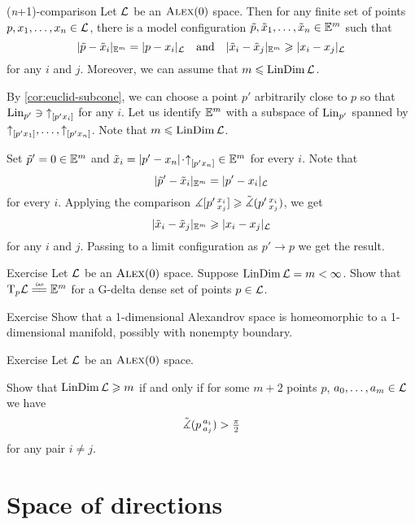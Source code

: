 \begin{thm}{(\textit{n}+1)-comparison}
Let $\mathcal{L}$ be an $\textsc{Alex}(0)$ space.
Then for any finite set of points $p,x_1,\dots,x_n\in \mathcal{L}$, there is a model configuration 
$\tilde p,\tilde x_1,\dots,\tilde x_n\in \mathbb{E}^m$ such that 
\[|\tilde p-\tilde x_i|_{\mathbb{E}^m}=| p- x_i|_{\mathcal{L}}
\quad\text{and}\quad
|\tilde x_i-\tilde x_j|_{\mathbb{E}^m}\geqslant |x_i- x_j|_{\mathcal{L}}\]
for any $i$ and $j$.
Moreover, we can assume that $m\leqslant \mathop{\rm LinDim}\nolimits\mathcal{L}$. 
\end{thm}

By \ref{cor:euclid-subcone}, we can choose a point $p'$ arbitrarily close to $p$ so that 
$\mathop{\rm Lin}\nolimits_{p'}\ni {\uparrow}_{[{p'}{x_i}]}$ for any $i$.
Let us identify $\mathbb{E}^m$ with a subspace of $\mathop{\rm Lin}\nolimits_{p'}$ spanned by ${\uparrow}_{[{p'}{x_1}]},\dots,{\uparrow}_{[{p'}{x_n}]}$.
Note that $m\leqslant \mathop{\rm LinDim}\nolimits\mathcal{L}$.

Set $\tilde p'=0\in \mathbb{E}^m$ and $\tilde x_i=\dist{p'}{x_n}{}\cdot\dir{p'}{x_n}\in \EE^m$ for every $i$.
Note that 
\[|\tilde p'-\tilde x_i|_{\mathbb{E}^m}=| p'- x_i|_{\mathcal{L}}\]
for every $i$.
Applying the comparison $\measuredangle[p'\,{}^{x_i}_{x_j}]\geqslant \tilde\measuredangle(p'\,{}^{x_i}_{x_j})$, we get
\[|\tilde x_i-\tilde x_j|_{\mathbb{E}^m}\geqslant |x_i- x_j|_{\mathcal{L}}\]
for any $i$ and $j$.
Passing to a limit configuration as $p'\to p$ we get the result.
\qeds

\begin{thm}{Exercise}\label{ex:tangent=Em}
Let $\mathcal{L}$ be an $\textsc{Alex}(0)$ space.
Suppose $\LinDim\spc{L}\z=m<\infty$.
Show that $\T_p\spc{L}\iso \EE^m$ for a G-delta dense set of points $p\in\mathcal{L}$.
\end{thm}

\begin{thm}{Exercise}\label{ex:dim=1}
Show that a 1-dimensional Alexandrov space is homeomorphic to a 1-dimensional manifold, possibly with nonempty boundary.
\end{thm}


\begin{thm}{Exercise}\label{ex:resporka}
Let $\mathcal{L}$ be an $\textsc{Alex}(0)$ space.

Show that $\mathop{\rm LinDim}\nolimits \mathcal{L}\geqslant m$ if and only if for some $m+2$ points $p$, $a_0,\z\dots, a_{m}\in \spc{L}$
we have
\[\tilde\measuredangle(p\,{}^{a_i}_{a_j})>\tfrac\pi2\]
for any pair $i\ne j$.
\end{thm}

\section{Space of directions}


